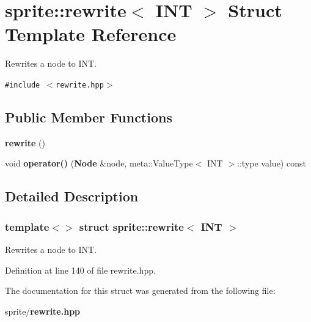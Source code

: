 \section{sprite::rewrite$<$ INT $>$ Struct Template Reference}
\label{structsprite_1_1rewrite_3_01INT_01_4}
Rewrites a node to INT.  


{\tt \#include $<$rewrite.hpp$>$}

\subsection*{Public Member Functions}
\begin{CompactItemize}
\item 
{\bf rewrite} ()\label{structsprite_1_1rewrite_3_01INT_01_4_a0}

\item 
void {\bf operator()} ({\bf Node} \&node, meta::Value\-Type$<$ INT $>$::type value) const \label{structsprite_1_1rewrite_3_01INT_01_4_a1}

\end{CompactItemize}


\subsection{Detailed Description}
\subsubsection*{template$<$$>$ struct sprite::rewrite$<$ INT $>$}

Rewrites a node to INT. 



Definition at line 140 of file rewrite.hpp.

The documentation for this struct was generated from the following file:\begin{CompactItemize}
\item 
sprite/{\bf rewrite.hpp}\end{CompactItemize}
